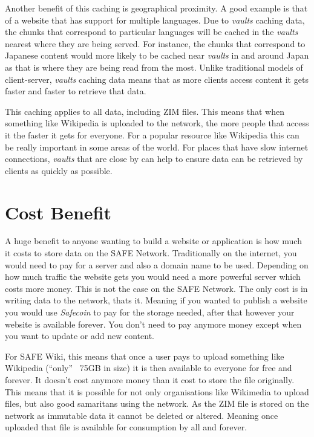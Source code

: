  Another benefit of this caching is geographical proximity. A good example is that of a website that has support for multiple languages. Due to \textit{vaults} caching data, the chunks that correspond to particular languages will be cached in the \textit{vaults} nearest where they are being served. For instance, the chunks that correspond to Japanese content would more likely to be cached near \textit{vaults} in and around Japan as that is where they are being read from the most. Unlike traditional models of client-server, \textit{vaults} caching data means that as more clients access content it gets faster and faster to retrieve that data.
 
 This caching applies to all data, including ZIM files. This means that when something like Wikipedia is uploaded to the network, the more people that access it the faster it gets for everyone. For a popular resource like Wikipedia this can be really important in some areas of the world. For places that have slow internet connections, \textit{vaults} that are close by can help to ensure data can be retrieved by clients as quickly as possible. 
 
 \section{Cost Benefit}
 
 A huge benefit to anyone wanting to build a website or application is how much it costs to store data on the SAFE Network. Traditionally on the internet, you would need to pay for a server and also a domain name to be used. Depending on how much traffic the website gets you would need a more powerful server which costs more money. This is not the case on the SAFE Network. The only cost is in writing data to the network, thats it. Meaning if you wanted to publish a website you would use \textit{Safecoin} to pay for the storage needed, after that however your website is available forever. You don't need to pay anymore money except when you want to update or add new content.
 
 For SAFE Wiki, this means that once a user pays to upload something like Wikipedia (``only'' ~75GB in size) it is then available to everyone for free and forever. It doesn't cost anymore money than it cost to store the file originally. This means that it is possible for not only organisations like Wikimedia to upload files, but also good samaritans using the network. As the ZIM file is stored on the network as immutable data it cannot be deleted or altered. Meaning once uploaded that file is available for consumption by all and forever.

